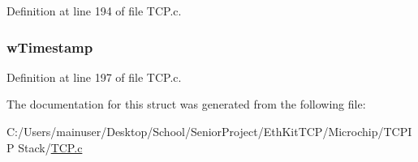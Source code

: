 Definition at line 194 of file T\+C\+P.\+c.

\hypertarget{struct_t_c_p___s_y_n___q_u_e_u_e_a0aa09af9f70a0f4959f9d8949c04df35}{}
\subsubsection[{w\+Timestamp}]{ w\+Timestamp}\label{struct_t_c_p___s_y_n___q_u_e_u_e_a0aa09af9f70a0f4959f9d8949c04df35}


Definition at line 197 of file T\+C\+P.\+c.



The documentation for this struct was generated from the following file\+:\begin{DoxyCompactItemize}
\item 
C\+:/\+Users/mainuser/\+Desktop/\+School/\+Senior\+Project/\+Eth\+Kit\+T\+C\+P/\+Microchip/\+T\+C\+P\+I\+P Stack/\hyperlink{_t_c_p_8c}{T\+C\+P.\+c}\end{DoxyCompactItemize}
